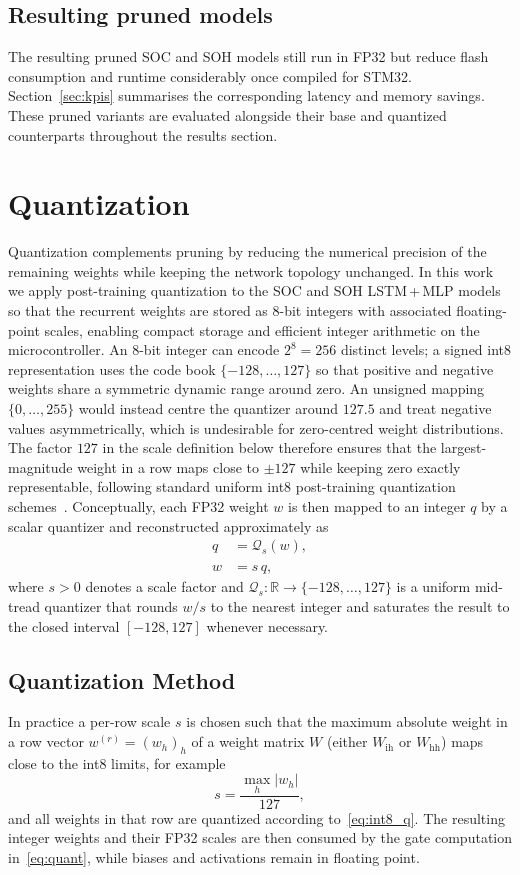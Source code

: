 \documentclass[review]{elsarticle}
\begin{document}
\subsection{Resulting pruned models}
The resulting pruned SOC and SOH models still run in FP32 but reduce flash consumption and runtime considerably once compiled for STM32. Section~\ref{sec:kpis} summarises the corresponding latency and memory savings. These pruned variants are evaluated alongside their base and quantized counterparts throughout the results section.
\section{Quantization}
Quantization complements pruning by reducing the numerical precision of the remaining weights while keeping the network topology unchanged. In this work we apply post-training quantization to the SOC and SOH LSTM\,+\,MLP models so that the recurrent weights are stored as 8-bit integers with associated floating-point scales, enabling compact storage and efficient integer arithmetic on the microcontroller. An 8-bit integer can encode $2^8 = 256$ distinct levels; a signed int8 representation uses the code book $\{-128,\ldots,127\}$ so that positive and negative weights share a symmetric dynamic range around zero. An unsigned mapping $\{0,\ldots,255\}$ would instead centre the quantizer around $127.5$ and treat negative values asymmetrically, which is undesirable for zero-centred weight distributions. The factor $127$ in the scale definition below therefore ensures that the largest-magnitude weight in a row maps close to $\pm 127$ while keeping zero exactly representable, following standard uniform int8 post-training quantization schemes~\cite{jacobQuantizationTrainingNeural2017,krishnamoorthiQuantizingDeepConvolutional2018}. Conceptually, each FP32 weight $w$ is then mapped to an integer $q$ by a scalar quantizer and reconstructed approximately as
\begin{align}
    q &= \mathcal{Q}_s(w), \label{eq:int8_q}\\
    \hat{w} &= s\,q, \label{eq:int8_w}
\end{align}
where $s>0$ denotes a scale factor and $\mathcal{Q}_s : \mathbb{R} \rightarrow \{-128,\ldots,127\}$ is a uniform mid-tread quantizer that rounds $w/s$ to the nearest integer and saturates the result to the closed interval $[-128,127]$ whenever necessary.
\subsection{Quantization Method}
In practice a per-row scale $s$ is chosen such that the maximum absolute weight in a row vector $w^{(r)} = (w_h)_h$ of a weight matrix $W$ (either $W_{\mathrm{ih}}$ or $W_{\mathrm{hh}}$) maps close to the int8 limits, for example
\begin{equation}
    s = \frac{\max_h |w_h|}{127},
\end{equation}
and all weights in that row are quantized according to~\eqref{eq:int8_q}. The resulting integer weights and their FP32 scales are then consumed by the gate computation in~\eqref{eq:quant}, while biases and activations remain in floating point.
\end{document}
